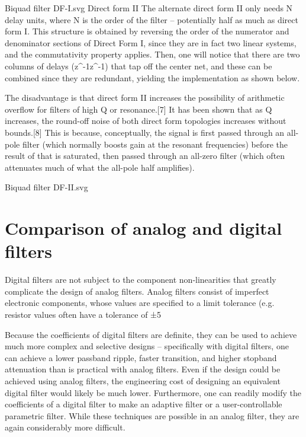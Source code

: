 \documentclass[12pt,a4paper,twocolumn]{scrartcl}
\begin{document}
Biquad filter DF-I.svg
Direct form II
The alternate direct form II only needs N delay units, where N is the order of the filter – potentially half as much as direct form I. This structure is obtained by reversing the order of the numerator and denominator sections of Direct Form I, since they are in fact two linear systems, and the commutativity property applies. Then, one will notice that there are two columns of delays ({\displaystyle z^{-1}}z^{-1}) that tap off the center net, and these can be combined since they are redundant, yielding the implementation as shown below.

The disadvantage is that direct form II increases the possibility of arithmetic overflow for filters of high Q or resonance.[7] It has been shown that as Q increases, the round-off noise of both direct form topologies increases without bounds.[8] This is because, conceptually, the signal is first passed through an all-pole filter (which normally boosts gain at the resonant frequencies) before the result of that is saturated, then passed through an all-zero filter (which often attenuates much of what the all-pole half amplifies).

Biquad filter DF-II.svg
\section{\centering Comparison of analog and digital filters}
Digital filters are not subject to the component non-linearities that greatly complicate the design of analog filters. Analog filters consist of imperfect electronic components, whose values are specified to a limit tolerance (e.g. resistor values often have a tolerance of ±5%

Because the coefficients of digital filters are definite, they can be used to achieve much more complex and selective designs – specifically with digital filters, one can achieve a lower passband ripple, faster transition, and higher stopband attenuation than is practical with analog filters. Even if the design could be achieved using analog filters, the engineering cost of designing an equivalent digital filter would likely be much lower. Furthermore, one can readily modify the coefficients of a digital filter to make an adaptive filter or a user-controllable parametric filter. While these techniques are possible in an analog filter, they are again considerably more difficult.
\end{document}
